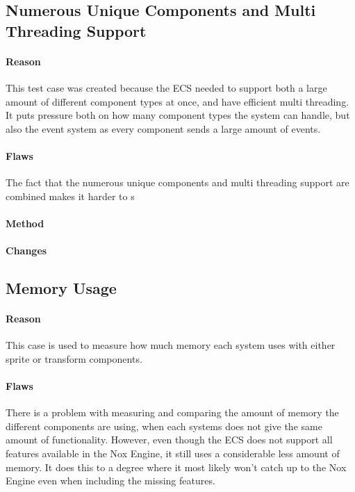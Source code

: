 \subsection{Numerous Unique Components and Multi Threading Support}
\paragraph{Reason}
This test case was created because the ECS needed to support both a large amount of different component types at once, and have efficient multi threading.
It puts pressure both on how many component types the system can handle, but also the event system as every component sends a large amount of events.

\paragraph{Flaws}
The fact that the numerous unique components and multi threading support are combined makes it harder to s

\paragraph{Method}
\paragraph{Changes}

\subsection{Memory Usage}
\paragraph{Reason}
This case is used to measure how much memory each system uses with either sprite or transform components.

\paragraph{Flaws}
There is a problem with measuring and comparing the amount of memory the different components are using, when each systems does not give the same amount of functionality.
However, even though the ECS does not support all features available in the Nox Engine, it still uses a considerable less amount of memory.
It does this to a degree where it most likely won't catch up to the Nox Engine even when including the missing features.


